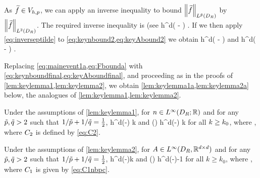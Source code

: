 As $\widetilde{f} \in V_{h,p}$, we can apply an inverse inequality to bound $\NLptildeDR{\ftilde}$ by $\NLtDR{\ftilde}$. The required inverse inequality is (see \cite[Theorem 4.5.11 and Remark 4.5.20]{BrSc:08}
\beq\label{eq:inverseptilde}
\NLptildeDR{\ftilde} \leq \Cinvptilde h^{d\mleft( - \half\mright)} \NLtDR{\ftilde}.
\eeq
If we then apply \cref{eq:inverseptilde} to \cref{eq:keynbound2,eq:keyAbound2} we obtain
\beq\label{eq:keynboundfinal}
 \leq \Cinvptilde {} h^{d\mleft( - \half\mright)} \NLtDR{\ftilde}
\eeq
and
\beq\label{eq:keyAboundfinal}
 \leq \Cinvptilde {} h^{d\mleft( - \half\mright)} \NLtDR{\grad\ftilde}.
\eeq

Replacing \cref{eq:mainevent1a,eq:Fbounda} with \cref{eq:keynboundfinal,eq:keyAboundfinal}, and proceeding as in the proofs of \cref{lem:keylemma1,lem:keylemma2}, we obtain \cref{lem:keylemma1a,lem:keylemma2a} below, the analogues of \cref{lem:keylemma1,lem:keylemma2}.

\label{lem:keylemma1a}
Under the assumptions of \cref{lem:keylemma1}, for $n\in \LiDRRR$ and for any $\tilde{p},\tilde{q} > 2$ such that $1/\tilde{p} + 1/\tilde{q} = \frac{1}{2}$,
\beq\label{eq:keybound12}
\max\set{\NDk{\AmatoI \Mmatn},\NDkI{\Mmatn\AmatoI}} \leq \Cttilde h^{d\mleft(-\half\mright)} k
\eeq
and 
\beq\label{eq:keybound1a2}
\max\set{\Nt{\AmatoI \Mmatn},\Nt{\Mmatn\AmatoI}} \leq \Cttilde\mleft(\frac{\mplus}{\mminus}\mright) h^{d\mleft(-\half\mright)} k
\eeq
for all $k\geq k_{0}$,
where
\beq\label{eq:C2tilde}
\Cttilde\de%
\Cinvptilde\Ct,
\eeq
where $C_{2}$ is defined by \cref{eq:C2}.
\ele

\label{lem:keylemma2a}
Under the assumptions of \cref{lem:keylemma2}, for $A\in L^\infty(D_{R},\mathbb R^{d\times d})$ and for any $\tilde{p},\tilde{q} > 2$ such that $1/\tilde{p} + 1/\tilde{q} = \frac{1}{2}$,
\beq\label{eq:keybound22}
\max\set{\NDk{\AmatoI \SmatA},\NDkI{\SmatA\AmatoI}} \leq \Cotilde h^{d\mleft(-\half\mright)}k 
\eeq
and
\beq\label{eq:keybound2a2}
\max\set{\Nt{\AmatoI \SmatA},\Nt{\SmatA\AmatoI}} \leq \Cotilde\mleft(\frac{\splus}{\mminus}\mright) h^{d\mleft(-\half\mright)-1} 
\eeq
for all $k\geq k_0$, where
\beq\label{eq:C1tildenbpc}
\Cotilde \de \Cinvptilde\Co,
\eeq
where $C_{1}$ is given by \cref{eq:C1nbpc}.
\ele



